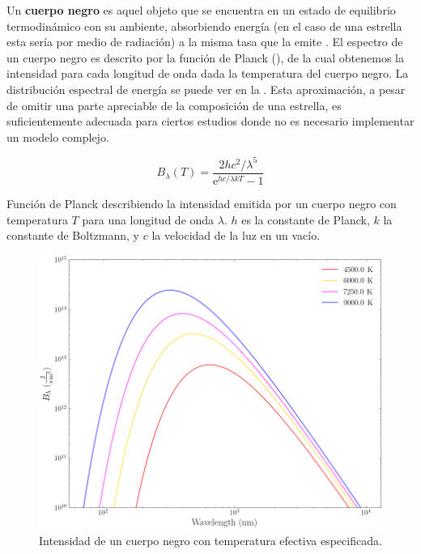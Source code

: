 Un \textbf{cuerpo negro} es aquel objeto que se encuentra en un estado de
equilibrio termodinámico con su ambiente, absorbiendo energía (en el caso de una
estrella esta sería por medio de radiación) a la misma tasa que la emite
. El espectro de un cuerpo
negro es descrito por la función de Planck
(), de la cual obtenemos la intensidad para
cada longitud de onda dada la temperatura del cuerpo negro. La distribución
espectral de energía se puede ver en la .
Esta aproximación, a pesar de omitir una parte apreciable de la composición de
una estrella, es suficientemente adecuada para ciertos estudios donde no es
necesario implementar un modelo complejo.

\begin{eqfloat}
	\centering
	\begin{equation}
		B_\lambda (T) = \frac{2hc^2 / \lambda^5}{\mathrm{e}^{hc/\lambda kT} - 1}
	\end{equation}
	\caption{Función de Planck describiendo la intensidad emitida por un cuerpo
	negro con temperatura $T$ para una longitud de onda $\lambda$. $h$ es la
	constante de Planck, $k$ la constante de Boltzmann, y $c$ la velocidad de la
	luz en un vacío.}
	\label{blackbodyPlanckEquation}
\end{eqfloat}

\begin{figure}[!ht]
	\centering
	\includegraphics[scale=0.5]{Introduccion/Figures/Figura Cuerpo Negro Espectro.png}
	\caption{Intensidad de un cuerpo negro con temperatura efectiva especificada.}
	\label{figuraCuerpoNegroEspectro}
\end{figure}

